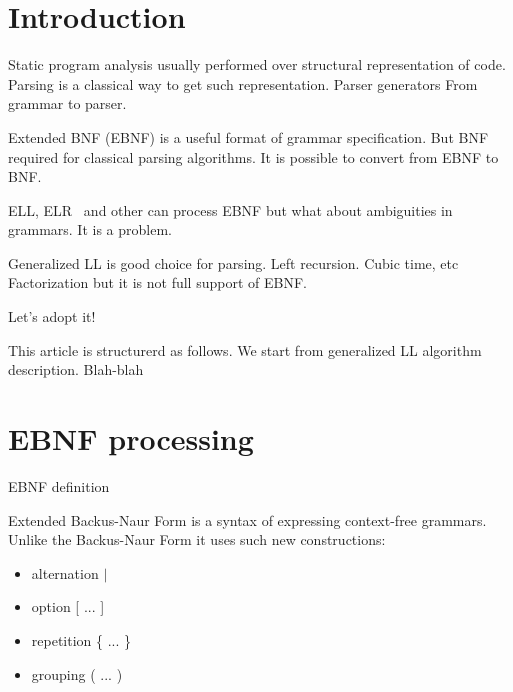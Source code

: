 \documentclass[runningheads,a4paper]{llncs}
\begin{document}
\section{Introduction}%

Static program analysis usually performed over structural representation of code. 
Parsing is a classical way to get such representation.
Parser generators 
From grammar to parser. 

Extended BNF (EBNF) is a useful format of grammar specification. 
But BNF required for classical parsing algorithms.
It is possible to convert from EBNF to BNF.

ELL, ELR~\cite{AttributedELL,ELRR,ECFGparsing,ELLParser,ELL,ECFG,ELALR,ELRParsing} and other can process EBNF but what about ambiguities in grammars. It is a problem.

Generalized LL is good choice for parsing.
Left recursion.
Cubic time, etc
Factorization but it is not full support of EBNF.

Let's adopt it! 

This article is structurerd as follows.
We start from generalized LL algorithm description.
Blah-blah





\section{EBNF processing}

EBNF definition

Extended Backus-Naur Form is a syntax of expressing context-free grammars. Unlike the Backus-Naur Form it 
uses such new constructions:
\begin{itemize}
    \item alternation $\mid$
    \item option [ ... ]
    \item repetition \{ ... \}
    \item grouping ( ... )
\end{itemize}
\end{document}
